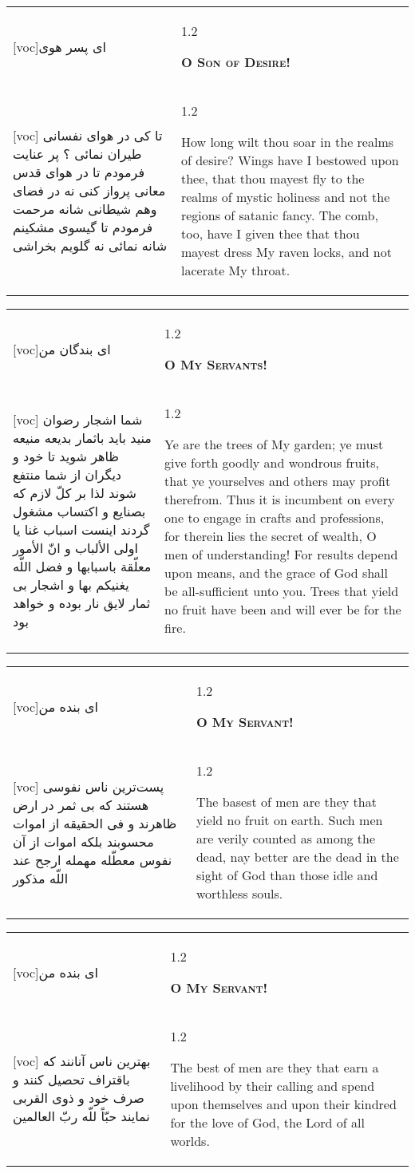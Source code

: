 \documentclass[11pt]{article}
\makeatletter
\newenvironment{orig}
  {\begin{farsi}[voc]}
  {\end{farsi}}
\newenvironment{trans}
  {\Large\begin{spacing}{1.2}\raggedright}
  {\end{spacing}}
\newenvironment{word}
  {\begin{tabular}[t]{p{2.75in}@{\hspace{3em}}p{2.75in}}}
  {\end{tabular}}
\newcommand{\ayat}[2]{\begin{orig}#1\end{orig} & \begin{trans}#2\end{trans}}
\newcommand{\heading}[2]{\textsc{\textbf{#1}} %
}
\makeatother
\begin{document}
\pagebreak

\begin{word}
\ayat{ای پسر هوی}{\heading{O Son of Desire!}{}} \\ \ayat{
تا کی در هوای نفسانی طيران نمائی ؟ پر عنايت فرمودم تا در هوای قدس معانی پرواز کنی نه در فضای وهم شيطانی
شانه مرحمت فرمودم تا گيسوی مشکينم شانه نمائی نه گلويم بخراشی
}{
  How long wilt thou soar in the realms of desire? Wings have I bestowed upon
  thee, that thou mayest fly to the realms of mystic holiness and not the
  regions of satanic fancy. The comb, too, have I given thee that thou mayest
  dress My raven locks, and not lacerate My throat.
}
\end{word}

\pagebreak

\begin{word}
\ayat{ای بندگان من}{\heading{O My Servants!}{}} \\ \ayat{
شما اشجار رضوان منيد بايد باثمار بديعه منيعه ظاهر شويد تا خود و ديگران از شما منتفع شوند
لذا بر کلّ لازم که بصنايع و اکتساب مشغول گردند
اينست اسباب غنا يا اولی الألباب و انّ الأمور معلّقة باسبابها و فضل اللّه يغنيکم بها
و اشجار بی ثمار لايق نار بوده و خواهد بود
}{
  Ye are the trees of My garden; ye must give forth goodly and wondrous
  fruits, that ye yourselves and others may profit therefrom. Thus it is
  incumbent on every one to engage in crafts and professions, for therein lies
  the secret of wealth, O men of understanding! For results depend upon means,
  and the grace of God shall be all-sufficient unto you. Trees that yield no
  fruit have been and will ever be for the fire.
}
\end{word}

\pagebreak

\begin{word}
\ayat{ای بنده من}{\heading{O My Servant!}{}} \\ \ayat{
پست‌ترين ناس نفوسی هستند که بی ثمر در ارض ظاهرند و فی الحقيقه از اموات محسوبند بلکه اموات از آن نفوس معطّله مهمله ارجح عند اللّه مذکور
}{
  The basest of men are they that yield no fruit on earth. Such men are verily
  counted as among the dead, nay better are the dead in the sight of God than
  those idle and worthless souls.
}
\end{word}

\pagebreak

\begin{word}
\ayat{ای بنده من}{\heading{O My Servant!}{}} \\ \ayat{
بهترين ناس آنانند که باقتراف تحصيل کنند و صرف خود و ذوی القربی نمايند حبّاً للّه ربّ العالمين
}{
  The best of men are they that earn a livelihood by their calling and spend
  upon themselves and upon their kindred for the love of God, the Lord of all
  worlds.
}
\end{word}
\end{document}
